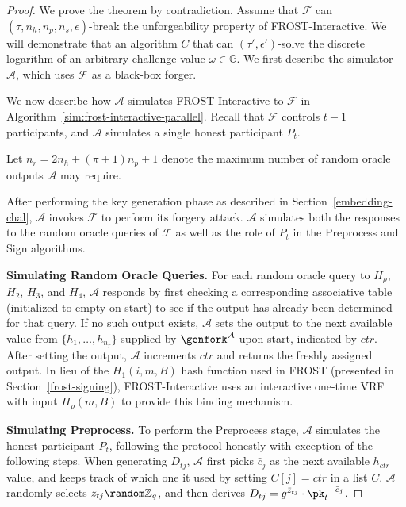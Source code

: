 \begin{proof}
We prove the theorem by contradiction. Assume that $\mathcal{F}$ can
$(\tau, n_h, n_p, n_s, \epsilon)$-break the
unforgeability property of FROST-Interactive. We will demonstrate that
an algorithm $C$ that can $(\tau', \epsilon')$-solve the discrete logarithm of an
arbitrary challenge value $\omega \in \mathbb{G}$. We first describe
the simulator $\mathcal{A}$, which uses $\mathcal{F}$ as a black-box forger.

We now describe how $\mathcal{A}$ simulates FROST-Interactive to
$\mathcal{F}$ in Algorithm~\ref{sim:frost-interactive-parallel}.
Recall that $\mathcal{F}$ controls $t-1$
participants, and $\mathcal{A}$ simulates a single honest participant $P_t$.

Let $n_r = 2 n_h + (\pi + 1)n_p + 1$
denote the maximum number of random oracle outputs $\mathcal{A}$ may require.

After performing the key generation phase as described in
Section~\ref{embedding-chal},
$\mathcal{A}$ invokes $\mathcal{F}$  to perform
its forgery attack.
$\mathcal{A}$  simulates both the responses to
the random oracle queries of $\mathcal{F}$ as well as the role
of $P_t$ in the Preprocess and Sign algorithms.

\textbf{Simulating Random Oracle Queries.} For each random oracle query to $H_{\rho}$,
$H_2$, $H_3$, and $H_4$, $\mathcal{A}$ responds by first checking a corresponding
associative table (initialized to empty on start) to see if the output has
already been determined for that query. If no such output exists, $\mathcal{A}$
sets the output to the next available value from $\{ h_1, \dots, h_{n_r} \}$
supplied by $\genfork^\mathcal{A}$ upon start, indicated by $ctr$. After setting the output,
$\mathcal{A}$ increments $ctr$ and returns the freshly assigned output.
In lieu of the $H_1(i, m, B)$
hash function used in FROST (presented in Section~\ref{frost-signing}),
FROST-Interactive uses an interactive one-time VRF with input $H_{\rho}(m, B)$ to
provide this binding mechanism.


\textbf{Simulating Preprocess.} To perform the Preprocess stage, $\mathcal{A}$
simulates the honest participant $P_t$, following the protocol honestly with
exception of the following steps. When generating $D_{tj}$,
$\mathcal{A}$ first
picks $\bar{c}_j$ as the next available $h_{ctr}$ value, and keeps track of
which one it used by setting $C[j] = ctr$ in a list $C$. $\mathcal{A}$
randomly selects
$\bar{z}_{tj} \random \mathbb{Z}_q$, and
then derives $D_{tj} = g^{\bar{z}_{tj}} \cdot{\pk_t}^{-\bar{c}_j}$.


\end{proof}
